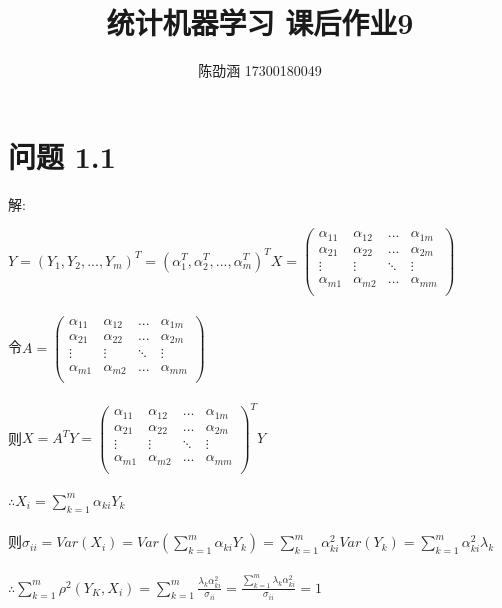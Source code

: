 \documentclass[]{article}
\title{统计机器学习 课后作业9}
\author{陈劭涵 17300180049}
\begin{document}
	
\maketitle


\section{问题 1.1}
\begin{flushleft}
解:
\end{flushleft}
$Y=(Y_1,Y_2,...,Y_m)^T=(\alpha_1^T,\alpha_2^T,...,\alpha_m^T)^T X=\begin{pmatrix}
	\alpha_{11}  & \alpha_{12}&... & \alpha_{1m}\\
	\alpha_{21}  & \alpha_{22}&... & \alpha_{2m}\\
	\vdots  & \vdots&\ddots & \vdots \\
	\alpha_{m1} &\alpha_{m2}&  ... & \alpha_{mm}\\
\end{pmatrix}$\\\\
令$A=\begin{pmatrix}
	\alpha_{11}  & \alpha_{12}&... & \alpha_{1m}\\
	\alpha_{21}  & \alpha_{22}&... & \alpha_{2m}\\
	\vdots  & \vdots&\ddots & \vdots \\
	\alpha_{m1} &\alpha_{m2}&  ... & \alpha_{mm}\\
\end{pmatrix}$\\\\
则$X=A^TY=\begin{pmatrix}
	\alpha_{11}  & \alpha_{12}&... & \alpha_{1m}\\
	\alpha_{21}  & \alpha_{22}&... & \alpha_{2m}\\
	\vdots  & \vdots&\ddots & \vdots \\
	\alpha_{m1} &\alpha_{m2}&  ... & \alpha_{mm}\\
\end{pmatrix}^TY$\\\\
$\therefore X_i=\sum_{k=1}^{m}\alpha_{ki}Y_k$\\\\
则$\sigma_{ii}=Var(X_i)=Var(\sum_{k=1}^{m}\alpha_{ki}Y_k)=\sum_{k=1}^{m}\alpha_{ki}^2Var(Y_k)=\sum_{k=1}^{m}\alpha_{ki}^2\lambda_k$\\\\
$\therefore \sum_{k=1}^{m}\rho^2(Y_K,X_i)=\sum_{k=1}^{m}\frac{\lambda_k\alpha_{ki}^2}{\sigma_{ii}}=\frac{\sum_{k=1}^{m}\lambda_k\alpha_{ki}^2}{\sigma_{ii}}=1$\\\\
\end{document}
